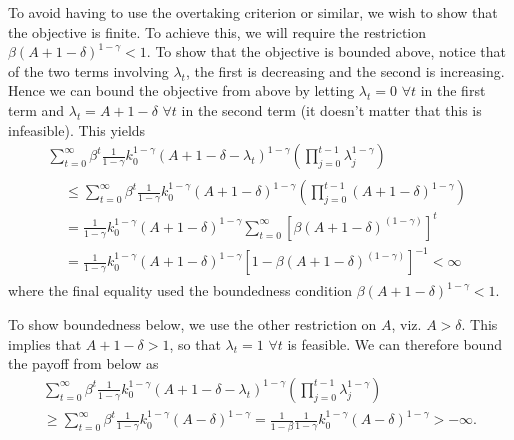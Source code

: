 \documentclass[11pt,letterpaper,reqno,oneside]{article}
\begin{document}
To avoid having to use the overtaking criterion or similar, we wish to show that the objective is finite. To achieve this, we will require the restriction $\beta( A + 1 - \delta )^{1-\gamma} < 1$. To show that the objective is bounded above, notice that of the two terms involving $\lambda_t$, the first is decreasing and the second is increasing. Hence we can bound the objective from above by letting $\lambda_t = 0$ $\forall t$ in the first term and $\lambda_t = A + 1 - \delta$ $\forall t$ in the second term (it doesn't matter that this is infeasible). This yields
%
\begin{multline*}
	\sum_{t=0}^\infty \beta^t 
	\tfrac{1}{1-\gamma} 
	k_0^{1-\gamma} 
	\left( A + 1-\delta - \lambda_t 
	\right)^{1-\gamma}
	\left( \prod_{j=0}^{t-1} \lambda_j^{1-\gamma} \right) 
	\\
	\begin{aligned}
		&\leq
		\sum_{t=0}^\infty \beta^t 
		\tfrac{1}{1-\gamma} 
		k_0^{1-\gamma} 
		\left( A + 1-\delta
		\right)^{1-\gamma}
		\left( \prod_{j=0}^{t-1} \left( A + 1 - \delta \right)^{1-\gamma} \right) 
		\\
		&=
		\tfrac{1}{1-\gamma} 
		k_0^{1-\gamma} 
		\left( A + 1-\delta
		\right)^{1-\gamma}
		\sum_{t=0}^\infty \left[ \beta
		\left( A + 1 - \delta \right)^{(1-\gamma)} \right]^t 
		\\
		&=
		\tfrac{1}{1-\gamma} 
		k_0^{1-\gamma} 
		\left( A + 1-\delta
		\right)^{1-\gamma}
		\left[ 1 - 
		\beta \left( A + 1 - \delta \right)^{(1-\gamma)} \right]^{-1}
		< \infty 
	\end{aligned}
\end{multline*}
%
where the final equality used the boundedness condition $\beta ( A + 1 - \delta )^{1-\gamma} < 1$.

To show boundedness below, we use the other restriction on $A$, viz. $A > \delta$. This implies that $A + 1 - \delta > 1$, so that $\lambda_t = 1$ $\forall t$ is feasible. We can therefore bound the payoff from below as
%
\begin{multline*}
	\sum_{t=0}^\infty \beta^t 
	\tfrac{1}{1-\gamma} 
	k_0^{1-\gamma} 
	\left( A + 1-\delta - \lambda_t 
	\right)^{1-\gamma}
	\left( \prod_{j=0}^{t-1} \lambda_j^{1-\gamma} \right) 
	\\
	\geq
	\sum_{t=0}^\infty \beta^t 
	\tfrac{1}{1-\gamma} 
	k_0^{1-\gamma} 
	\left( A - \delta \right)^{1-\gamma}
	=
	\tfrac{1}{1-\beta}
	\tfrac{1}{1-\gamma} 
	k_0^{1-\gamma} 
	\left( A - \delta \right)^{1-\gamma}
	> -\infty .
\end{multline*}
\end{document}
